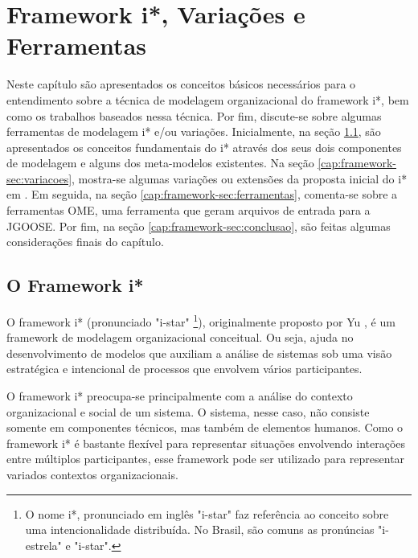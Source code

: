 \chapter{Framework i*, Variações e Ferramentas}
    \label{cap:framework}
        Neste capítulo são apresentados os conceitos básicos necessários para o entendimento sobre a técnica de modelagem organizacional do framework i*, bem como os trabalhos baseados nessa técnica.
        Por fim, discute-se sobre algumas ferramentas de modelagem i* e/ou variações.
            Inicialmente, na seção \ref{cap:framework-sec:istar}, são apresentados os conceitos fundamentais do i* através dos seus dois componentes de modelagem e alguns dos meta-modelos existentes.
            Na seção \ref{cap:framework-sec:variacoes}, mostra-se algumas variações ou extensões da proposta inicial do i* em \cite{yu1995modelling}.
            Em seguida, na seção \ref{cap:framework-sec:ferramentas}, comenta-se sobre a ferramentas OME, uma ferramenta que geram arquivos de entrada para a JGOOSE.
            Por fim, na seção \ref{cap:framework-sec:conclusao}, são feitas algumas considerações finais do capítulo.
    \section{O Framework i*}
        \label{cap:framework-sec:istar}
                O framework i* (pronunciado "i-star"
                        \footnote{O nome i*, pronunciado em inglês "i-star" faz referência ao conceito sobre uma intencionalidade distribuída. No Brasil, são comuns as pronúncias "i-estrela" e "i-star".}),
                    originalmente proposto por Yu \cite{yu1995modelling},
                é um framework de modelagem organizacional conceitual.
                Ou seja, ajuda no desenvolvimento de modelos que auxiliam a análise de sistemas sob uma visão estratégica e intencional de processos que envolvem vários participantes.

                O framework i* preocupa-se principalmente com a análise do contexto organizacional e social de um sistema.
                O sistema, nesse caso, não consiste somente em componentes técnicos, mas também de elementos humanos.
                Como o framework i* é bastante flexível para representar situações envolvendo interações entre múltiplos participantes,
                esse framework pode ser utilizado para representar variados contextos organizacionais.

